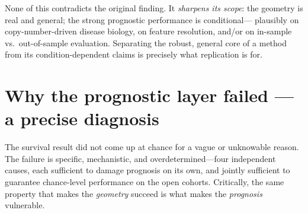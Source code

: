 \documentclass[11pt]{article}
\begin{document}
None of this contradicts the original finding. It \emph{sharpens its scope}: the
geometry is real and general; the strong prognostic performance is conditional---
plausibly on copy-number-driven disease biology, on feature resolution, and/or on
in-sample vs.\ out-of-sample evaluation. Separating the robust, general core of a
method from its condition-dependent claims is precisely what replication is for.

\section{Why the prognostic layer failed --- a precise diagnosis}

The survival result did not come up at chance for a vague or unknowable reason.
The failure is specific, mechanistic, and overdetermined---four independent
causes, each sufficient to damage prognosis on its own, and jointly sufficient to
guarantee chance-level performance on the open cohorts. Critically, the same
property that makes the \emph{geometry} succeed is what makes the
\emph{prognosis} vulnerable.
\end{document}
